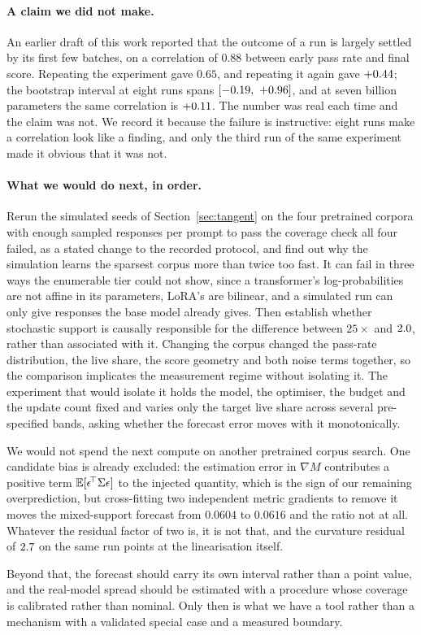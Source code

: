 \paragraph{A claim we did not make.} An earlier draft of this work reported that the outcome of a
run is largely settled by its first few batches, on a correlation of $0.88$ between early pass rate
and final score. Repeating the experiment gave $0.65$, and repeating it again gave
$+0.44$; the bootstrap interval at eight runs spans
$[\numEarlyCorrelationLow,\ \numEarlyCorrelationHigh]$, and at seven billion parameters the same
correlation is $+0.11$. The number was real each time and the claim was not. We record it because
the failure is instructive: eight runs make a correlation look like a finding, and only the third
run of the same experiment made it obvious that it was not.

\paragraph{What we would do next, in order.} Rerun the simulated seeds of
Section~\ref{sec:tangent} on the four pretrained corpora with enough sampled responses per prompt
to pass the coverage check all four failed, as a stated change to the recorded protocol, and find
out why the simulation learns the sparsest corpus more than twice too fast. It can fail in three ways
the enumerable tier could not show, since a transformer's log-probabilities are not affine in its
parameters, LoRA's are bilinear, and a simulated run can only give responses the base model
already gives. Then establish whether stochastic support is causally
responsible for the difference between $25\times$ and $2.0$, rather than associated
with it. Changing the corpus changed the pass-rate distribution, the live share, the score
geometry and both noise terms together, so the comparison implicates the measurement regime
without isolating it. The experiment that would isolate it holds the model, the optimiser, the
budget and the update count fixed and varies only the target live share across several
pre-specified bands, asking whether the forecast error moves with it monotonically.

We would not spend the next compute on another pretrained corpus search. One candidate bias is
already excluded: the estimation error in $\nabla M$ contributes a positive term
$\mathbb{E}[\epsilon^{\!\top}\Sigma\epsilon]$ to the injected quantity, which is the sign of our remaining
overprediction, but cross-fitting two independent metric gradients to remove it moves the
mixed-support forecast from $0.0604$ to $0.0616$ and the ratio not at all. Whatever the residual
factor of two is, it is not that, and the curvature residual of $2.7$ on the same
run points at the linearisation itself.

Beyond that, the forecast should carry its own interval rather than a point value, and the
real-model spread should be estimated with a procedure whose coverage is calibrated rather than
nominal. Only then is what we have a tool rather than a mechanism with a validated special case
and a measured boundary.
